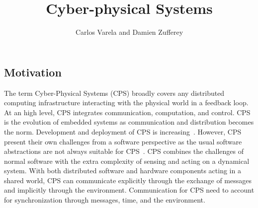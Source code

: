 \documentclass[
graybox,
envcountchap
]{svmult}
\begin{document}
\begin{bibunit}
	
\title*{Cyber-physical Systems}
\author{Carlos Varela and Damien Zufferey}
	
\maketitle
	
	
\section{Motivation}\label{sec:Intro}


The term Cyber-Physical Systems (CPS) broadly covers any distributed computing infrastructure interacting with the physical world in a feedback loop.
At an high level, CPS integrates communication, computation, and control.
CPS is the evolution of embedded systems as communication and distribution becomes the norm.
Development and deployment of CPS is increasing~\cite{DBLP:journals/cacm/KumarK15}.
However, CPS present their own challenges from a software perspective as the usual software abstractions are not always suitable for CPS~\cite{Lee:EECS-2008-8}.
CPS combines the challenges of normal software with the extra complexity of sensing and acting on a dynamical system.
With both distributed software and hardware components acting in a shared world, CPS can communicate explicitly through the exchange of messages and implicitly through the environment.
Communication for CPS need to account for synchronization through messages, time, and the environment.


\end{bibunit}
\end{document}
